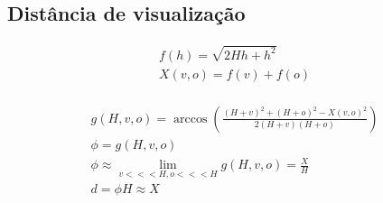 \subsection{Dist\^ancia de visualiza\c{c}\~ao}
\begin{equation}
\begin{array}{c}
f(h) = \sqrt{2Hh+h^2} \\
X(v,o) = f(v)+f(o) \\
\end{array}
\end{equation}

\begin{equation}
\begin{array}{c}
g(H,v,o) =\arccos\left(\frac{(H+v)^2 + (H+o)^2-X(v,o)^2}{2(H+v)(H+o)}\right) \\
\phi = g(H,v,o) \\
\phi \approx \lim_{v<<<H,o<<<H}g(H,v,o) = \frac{X}{H} \\
d = \phi H \approx X
\end{array}
\end{equation}

\begin{equation}
\end{equation}
